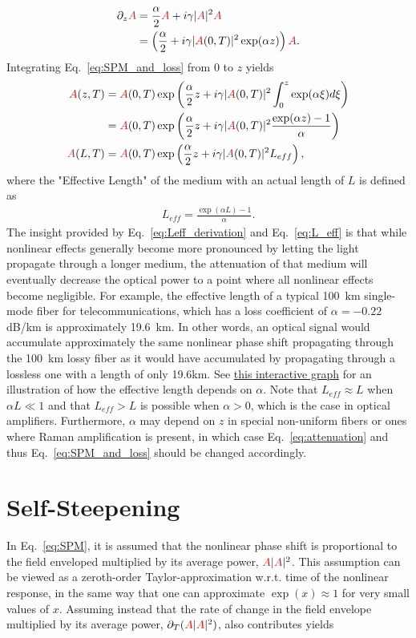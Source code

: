 \begin{align}
\label{eq:SPM_and_loss}
    \partial_z\textcolor{red}{A} &= \frac{\alpha}{2}\textcolor{red}{A} +i\gamma|\textcolor{red}{A}|^2\textcolor{red}{A}\\ \nonumber
    &=\left(\frac{\alpha}{2} +i\gamma |\textcolor{red}{A}(0,T)|^2 \exp(\alpha z) \right)\textcolor{red}{A}. 
\end{align}
Integrating Eq.~\ref{eq:SPM_and_loss} from $0$ to $z$ yields
\begin{align}
    \label{eq:Leff_derivation}
    \textcolor{red}{A}(z,T)&=\textcolor{red}{A}(0,T) \exp\left( \frac{\alpha}{2}z+i\gamma|\textcolor{red}{A}(0,T)|^2 \int_0^z \exp(\alpha\xi) d\xi  \right) \\ \nonumber
    &=\textcolor{red}{A}(0,T) \exp\left( \frac{\alpha}{2}z+i\gamma|\textcolor{red}{A}(0,T)|^2  \frac{\exp(\alpha z)-1}{\alpha}   \right) \\ \nonumber
    \textcolor{red}{A}(L,T)&=\textcolor{red}{A}(0,T) \exp\left( \frac{\alpha}{2}z+i\gamma|\textcolor{red}{A}(0,T)|^2  L_{eff}   \right),
\end{align}
where the "Effective Length" of the medium with an actual length of $L$ is defined as
\begin{align}
\label{eq:L_eff}
    L_{eff}= \frac{\exp(\alpha L)-1}{\alpha}.
\end{align}
The insight provided by Eq.~\ref{eq:Leff_derivation} and Eq.~\ref{eq:L_eff} is that while nonlinear effects generally become more pronounced by letting the light propagate through a longer medium, the attenuation of that medium will eventually decrease the optical power to a point where all nonlinear effects become negligible. For example, the effective length of a typical 100~km single-mode fiber for telecommunications, which has a loss coefficient of $\alpha=-0.22$dB/km is approximately 19.6~km. In other words, an optical signal would accumulate approximately the same nonlinear phase shift propagating through the 100~km lossy fiber as it would have accumulated by propagating through a lossless one with a length of only 19.6km. See \href{https://www.desmos.com/calculator/g6dadbxq33}{this interactive graph} for an illustration of how the effective length depends on $\alpha$. Note that $L_{eff}\approx L$ when $\alpha L\ll 1$ and that $L_{eff}>L$ is possible when $\alpha>0$, which is the case in optical amplifiers. Furthermore, $\alpha$ may depend on $z$ in special non-uniform fibers or ones where Raman amplification is present, in which case Eq.~\ref{eq:attenuation} and thus Eq.~\ref{eq:SPM_and_loss} should be changed accordingly.   

\section{Self-Steepening}
\label{sec:SS}
In Eq.~\ref{eq:SPM}, it is assumed that the nonlinear phase shift is proportional to the field enveloped multiplied by its average power, $\textcolor{red}{A}|\textcolor{red}{A}|^2$. This assumption can be viewed as a zeroth-order Taylor-approximation w.r.t. time of the nonlinear response, in the same way that one can approximate $\exp(x)\approx 1$ for very small values of $x$. Assuming instead that the rate of change in the field envelope multiplied by its average power, $\partial_T(\textcolor{red}{A}|\textcolor{red}{A}|^2)$, also contributes yields

